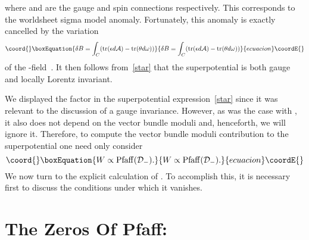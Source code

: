 \documentclass[a4paper,12pt]{article}
\numberwithin{equation}{section}
\theoremstyle{plain}
\begin{document}
%
where \coordHE{} and \myHighlight{$\omega$}\coordHE{} are the gauge and spin connections
respectively.
This corresponds to the worldsheet sigma model anomaly. Fortunately, this
anomaly
is exactly cancelled by the variation
%
\begin{equation}\coord{}\boxEquation{
\delta B = \int_C ({\rm tr} (\epsilon d{\cal{A}}) -{\rm tr}
(\theta d\omega))
\label{13}
}{
\delta B = \int_C ({\rm tr} (\epsilon d{\cal{A}}) -{\rm tr}
(\theta d\omega))
}{ecuacion}\coordE{}\end{equation}
of the \coordHE{}-field~\cite{Witten2}. It then follows from~\eqref{star}
that the
superpotential \coordHE{} is both gauge and locally Lorentz invariant.

We displayed the factor \coordHE{} in the
superpotential expression~\eqref{star} since it was relevant to the
discussion
of a gauge invariance. However, as was the case with
\coordHE{},
it also does not depend on the vector bundle moduli and, henceforth, we
will
ignore it. Therefore, to compute the vector bundle moduli contribution to
the superpotential one need only consider
%
\begin{equation}\coord{}\boxEquation{
W \propto {\rm Pfaff}({\cal D}_{-}).
\label{14}
}{
W \propto {\rm Pfaff}({\cal D}_{-}).
}{ecuacion}\coordE{}\end{equation}
%
We now turn to the explicit calculation of \coordHE{}. To
accomplish this, it is necessary first to discuss the conditions under
which it vanishes.


\section{The Zeros Of Pfaff\coordHE{}:}

\end{document}
